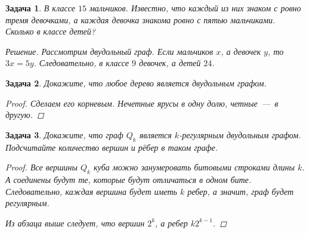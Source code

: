 \documentclass[12pt,a4paper,fleqn]{article}
\newtheorem{exersize}{Задача}
\begin{document}
\begin{exersize}
	В классе $15$ мальчиков. Известно, что каждый из них знаком с ровно тремя девочками, а каждая девочка знакома ровно с пятью мальчиками. Сколько в классе детей?
		
	\emph{Решение.} Рассмотрим двудольный граф. Если мальчиков $x$, а девочек $y$, то $3x = 5y$. Следовательно, в классе $9$ девочек, а детей $24$.
\end{exersize}

\begin{exersize}
	Докажите, что любое дерево является двудольным графом.
	
\begin{proof}
	Сделаем его корневым. Нечетные ярусы в одну долю, четные~---~в другую.
\end{proof}
\end{exersize}

\begin{exersize}
	Докажите, что граф $Q_k$ является $k$-регулярным двудольным графом. Подсчитайте количество вершин и рёбер в таком графе.
	
\begin{proof}
	Все вершины $Q_k$ куба можно занумеровать битовыми строками длины $k$. А соединены будут те, которые будут отличаться в одном бите. Следовательно, каждая вершина будет иметь $k$ ребер, а значит, граф будет регулярным.
	
	Из абзаца выше следует, что вершин $2^k$, а ребер $k2^{k-1}$.
\end{proof}
\end{exersize}
\end{document}
